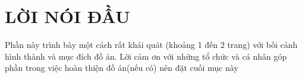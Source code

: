 \section*{LỜI NÓI ĐẦU} %
\thispagestyle{empty}
Phần này trình bày một cách rất khái quát (khoảng 1 đến 2 trang) với bối cảnh hình thành và mục đích đồ án. 
Lời cảm ơn với những tổ chức và cá nhân góp phần trong việc hoàn thiện đồ án(nếu có) nên đặt cuối mục này

\cleardoublepage
